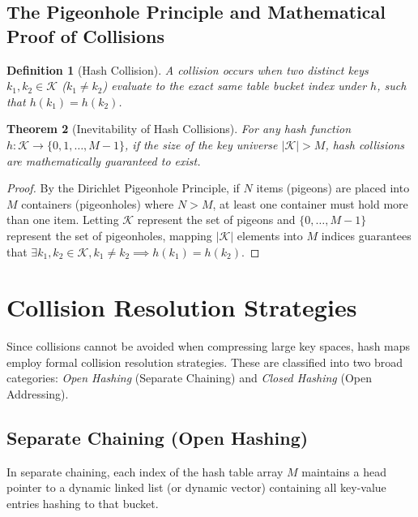 \documentclass[10pt,journal,compsoc,onecolumn]{IEEEtran}
\newtheorem{theorem}{Theorem}
\newtheorem{definition}[theorem]{Definition}
\begin{document}
\subsection{The Pigeonhole Principle and Mathematical Proof of Collisions}

\begin{definition}[Hash Collision]
A collision occurs when two distinct keys $k_1, k_2 \in \mathcal{K}$ ($k_1 \neq k_2$) evaluate to the exact same table bucket index under $h$, such that $h(k_1) = h(k_2)$.
\end{definition}

\begin{theorem}[Inevitability of Hash Collisions]
For any hash function $h: \mathcal{K} \to \{0, 1, \dots, M-1\}$, if the size of the key universe $|\mathcal{K}| > M$, hash collisions are mathematically guaranteed to exist.
\end{theorem}
\begin{proof}
By the Dirichlet Pigeonhole Principle, if $N$ items (pigeons) are placed into $M$ containers (pigeonholes) where $N > M$, at least one container must hold more than one item. Letting $\mathcal{K}$ represent the set of pigeons and $\{0, \dots, M-1\}$ represent the set of pigeonholes, mapping $|\mathcal{K}|$ elements into $M$ indices guarantees that $\exists k_1, k_2 \in \mathcal{K}, k_1 \neq k_2 \implies h(k_1) = h(k_2)$.
\end{proof}

\section{Collision Resolution Strategies}
\label{sec:collision-resolution}

Since collisions cannot be avoided when compressing large key spaces, hash maps employ formal collision resolution strategies. These are classified into two broad categories: \emph{Open Hashing} (Separate Chaining) and \emph{Closed Hashing} (Open Addressing).

\subsection{Separate Chaining (Open Hashing)}
In separate chaining, each index of the hash table array $M$ maintains a head pointer to a dynamic linked list (or dynamic vector) containing all key-value entries hashing to that bucket.
\end{document}
